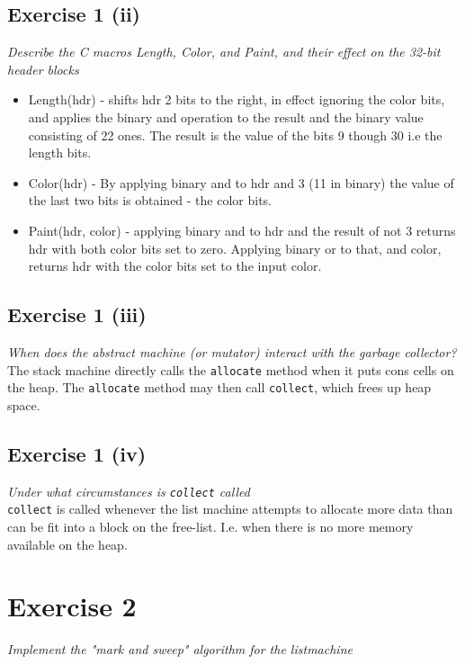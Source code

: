 \documentclass[a4paper, titlepage]{article}
\begin{document}
\subsection{Exercise 1 (ii)}
\textit{Describe the C macros Length, Color, and Paint, and their effect on the
32-bit header blocks}\\

\begin{itemize}
	\item Length(hdr) - shifts hdr 2 bits to the right, in effect
		ignoring the color bits, and applies the binary and operation to
		the result and the binary value consisting of 22 ones. The
		result is the value of the bits 9 though 30 i.e the length bits.
	\item Color(hdr) - By applying binary and to hdr and 3 (11 in binary)
		the value of the last two bits is obtained - the color bits.
	\item Paint(hdr, color) - applying binary and to hdr and the result of
		not 3 returns hdr with both color bits set to zero. Applying
		binary or to that, and color, returns hdr with the color bits
		set to the input color.
\end{itemize}
\subsection{Exercise 1 (iii)}
\textit{When does the abstract machine (or mutator) interact with the garbage
collector?}\\

The stack machine directly calls the \texttt{allocate} method when it puts cons
cells on the heap. The \texttt{allocate} method may then call \texttt{collect},
which frees up heap space.

\subsection{Exercise 1 (iv)}
\textit{Under what circumstances is \emph{\texttt{collect}} called}\\

\texttt{collect} is called whenever the list machine attempts to allocate more
data than can be fit into a block on the free-list. I.e. when there is no more
memory available on the heap.

\section{Exercise 2}
\textit{Implement the "mark and sweep" algorithm for the listmachine}\\
\end{document}
